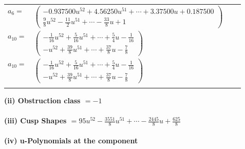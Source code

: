 \documentclass[1p]{elsarticle_modified}
\theoremstyle{definition}
\begin{document}
\begin{tabular}{m{7pt} m{180pt} m{7pt} m{180pt} }
\flushright $a_{6}=$&$\begin{pmatrix}-0.937500 u^{52}+4.56250 u^{51}+\cdots+3.37500 u+0.187500\\\frac{9}{8} u^{52}-\frac{11}{2} u^{51}+\cdots-\frac{33}{8} u+1\end{pmatrix}$ \\
\flushright $a_{10}=$&$\begin{pmatrix}-\frac{1}{16} u^{52}+\frac{5}{16} u^{51}+\cdots+\frac{5}{4} u-\frac{1}{16}\\- u^{52}+\frac{39}{8} u^{51}+\cdots+\frac{37}{8} u-\frac{7}{8}\end{pmatrix}$\\ \flushright $a_{10}=$&$\begin{pmatrix}-\frac{1}{16} u^{52}+\frac{5}{16} u^{51}+\cdots+\frac{5}{4} u-\frac{1}{16}\\- u^{52}+\frac{39}{8} u^{51}+\cdots+\frac{37}{8} u-\frac{7}{8}\end{pmatrix}$\\&\end{tabular}
\flushleft \textbf{(ii) Obstruction class $= -1$}\\~\\
\flushleft \textbf{(iii) Cusp Shapes $= 95 u^{52}-\frac{3551}{8} u^{51}+\cdots-\frac{2445}{8} u+\frac{625}{8}$}\\~\\
\newpage\renewcommand{\arraystretch}{1}
\flushleft \textbf{(iv) u-Polynomials at the component}\newline \\
\end{document}
